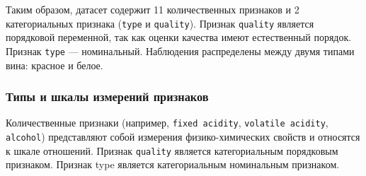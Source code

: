 Таким образом, датасет содержит 11 количественных признаков и 2 категориальных признака (\texttt{type} и \texttt{quality}). Признак \texttt{quality} является порядковой переменной, так как оценки качества имеют естественный порядок. Признак \texttt{type} — номинальный. Наблюдения распределены между двумя типами вина: красное и белое.
 
\subsubsection*{Типы и шкалы измерений признаков}
 
Количественные признаки (например, \texttt{fixed acidity}, \texttt{volatile acidity}, \texttt{alcohol}) представляют собой измерения физико-химических свойств и относятся к шкале отношений. Признак \texttt{quality} является категориальным порядковым признаком. Признак type является категориальным номинальным признаком.

